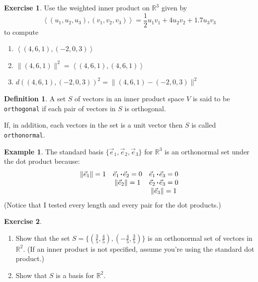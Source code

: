 \documentclass{beamer}
\newcommand{\R}{\mathbb{R}}
\newcommand{\fn}{\insertframenumber}
\newcommand{\ip}[2]{\left\langle #1,#2\right\rangle}
\newcommand{\dotp}{\,{\boldsymbol{\cdot}\hspace*{.01in}}}
\theoremstyle{definition}
\newtheorem{exercise}{Exercise}
\newtheorem*{defn}{Definition}
\newtheorem*{exa}{Example}
\renewcommand{\emph}[1]{{\color{blue}\texttt{#1}}}
\begin{document}
\begin{frame}{\fn}
	\begin{exercise}
		Use the weighted inner product on $\R^3$ given by
			\[\ip{(u_1,u_2,u_3)}{(v_1,v_2,v_3)}=\frac{1}{2}u_1v_1+4u_2v_2+1.7u_3v_3\]
		to compute
		\begin{enumerate}[label=(\alph*)]
			\item $\ip{(4,6,1)}{(-2,0,3)}$
			\item $\|(4,6,1)\|^2=\ip{(4,6,1)}{(4,6,1)}$
			\item $d((4,6,1),(-2,0,3))^2=\|(4,6,1)-(-2,0,3)\|^2$
		\end{enumerate}
	\end{exercise}
\end{frame}
\begin{frame}{\fn}
	\begin{defn}
		A set $S$ of vectors in an inner product space $V$ is said to be \emph{orthogonal} if each pair of vectors in $S$ is orthogonal.
		
		If, in addition, each vectors in the set is a unit vector then $S$ is called \emph{orthonormal}.
	\end{defn}
	\begin{exa}
		The standard basis $\{\vec e_1,\vec e_2,\vec e_3\}$ for $\R^3$ is an orthonormal set under the dot product because:
			\[\begin{array}{ccc}
				\|\vec e_1\|=1 & {\vec e_1}\dotp{\vec e_2}=0 & {\vec e_1}\dotp{\vec e_3}=0\\
				 & \|\vec e_2\|=1 & {\vec e_2}\dotp{\vec e_3}=0\\
				 &  & \|\vec e_3\|=1\\
			\end{array}\]
		(Notice that I tested every length and every pair for the dot products.)
	\end{exa}
\end{frame}
\begin{frame}{\fn}
	\begin{exercise}
		\begin{enumerate}[label=(\alph*)]
			\item Show that the set $S=\{(\frac{3}{5},\frac{4}{5}),(-\frac{4}{5},\frac{3}{5})\}$ is an orthonormal set of vectors in $\R^2$. (If an inner product is not specified, assume you're using the standard dot product.)
		
			\item Show that $S$ is a basis for $\R^2$.
		\end{enumerate}
	\end{exercise}
\end{frame}
\end{document}
